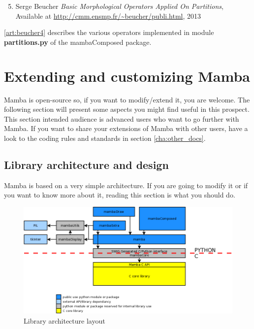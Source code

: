 \documentclass[a4paper,10pt,oneside]{article}
\begin{document}
\begin{enumerate}
\setcounter{enumi}{4}
\item \label{art:beucher4} Serge Beucher
\emph{Basic Morphological Operators Applied On Partitions},
Available at \url{http://cmm.ensmp.fr/~beucher/publi.html}, 2013
\end{enumerate}

\ref{art:beucher4} describes the various operators implemented in
module \textbf{partitions.py} of the mambaComposed package.

\pagebreak

\section{Extending and customizing Mamba}

Mamba is open-source so, if you want to modify/extend it, you are welcome. The
following section will present some aspects you might find useful in this
prospect. This section intended audience is advanced users who want to go 
further with Mamba. If you want to share your extensions of Mamba with other users,
have a look to the coding rules and standards in section \ref{cha:other_docs}. 

\subsection{Library architecture and design}
\label{cha:lib_arch}

Mamba is based on a very simple architecture. If you are going to modify it or
if you want to know more about it, reading this section is what you should do.

\begin{figure}
\centering
\includegraphics[scale=0.5]{archi.png}
\caption{Library architecture layout}
\label{fig:archi_lay}
\end{figure}
\end{document}
